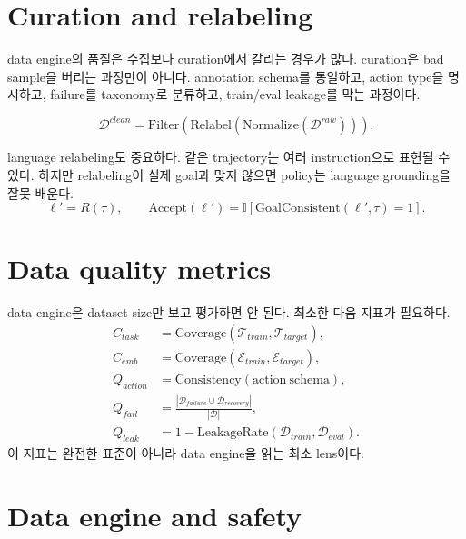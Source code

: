 \section{Curation and relabeling}

data engine의 품질은 수집보다 curation에서 갈리는 경우가 많다. curation은 bad sample을 버리는 과정만이 아니다. annotation schema를 통일하고, action type을 명시하고, failure를 taxonomy로 분류하고, train/eval leakage를 막는 과정이다.

\begin{equation}
  \mathcal{D}^{clean}
  =
  \mathrm{Filter}
  (
  \mathrm{Relabel}
  (
  \mathrm{Normalize}
  (
  \mathcal{D}^{raw}
  )
  )
  ).
  \label{eq:ch14-curation}
\end{equation}

language relabeling도 중요하다. 같은 trajectory는 여러 instruction으로 표현될 수 있다. 하지만 relabeling이 실제 goal과 맞지 않으면 policy는 language grounding을 잘못 배운다.
\begin{equation}
  \ell'
  =
  R(\tau),
  \qquad
  \mathrm{Accept}(\ell')
  =
  \mathbb{I}
  [
  \mathrm{GoalConsistent}(\ell',\tau)=1
  ].
  \label{eq:ch14-relabel-accept}
\end{equation}

\section{Data quality metrics}

data engine은 dataset size만 보고 평가하면 안 된다. 최소한 다음 지표가 필요하다.
\begin{align}
  C_{task} &= \mathrm{Coverage}(\mathcal{T}_{train},\mathcal{T}_{target}), \\
  C_{emb} &= \mathrm{Coverage}(\mathcal{E}_{train},\mathcal{E}_{target}), \\
  Q_{action} &= \mathrm{Consistency}(\mathrm{action\ schema}), \\
  Q_{fail} &= \frac{|\mathcal{D}_{failure}\cup\mathcal{D}_{recovery}|}{|\mathcal{D}|}, \\
  Q_{leak} &= 1-\mathrm{LeakageRate}(\mathcal{D}_{train},\mathcal{D}_{eval}).
  \label{eq:ch14-data-quality}
\end{align}
이 지표는 완전한 표준이 아니라 data engine을 읽는 최소 lens이다.

\section{Data engine and safety}

